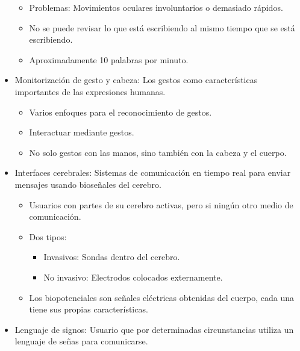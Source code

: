 \documentclass[12pt, twoside, openright]{report} %
\begin{document}
\begin{itemize}
	      \begin{itemize}
		      \item Problemas: Movimientos oculares involuntarios o demasiado rápidos.

		      \item No se puede revisar lo que está escribiendo al mismo tiempo que se
		            está escribiendo.

		      \item Aproximadamente 10 palabras por minuto.
	      \end{itemize}
	      \pagebreak
	\item Monitorización de gesto y cabeza: Los gestos como características
	      importantes de las expresiones humanas.

	      \begin{itemize}
		      \item Varios enfoques para el reconocimiento de gestos.

		      \item Interactuar mediante gestos.

		      \item No solo gestos con las manos, sino también con la cabeza y el
		            cuerpo.
	      \end{itemize}
	\item Interfaces cerebrales: Sistemas de comunicación en tiempo real para
	      enviar mensajes usando bioseñales del cerebro.

	      \begin{itemize}
		      \item Usuarios con partes de su cerebro activas, pero si ningún otro
		            medio de comunicación.

		      \item Dos tipos:

		            \begin{itemize}
			            \item Invasivos: Sondas dentro del cerebro.

			            \item No invasivo: Electrodos colocados externamente.
		            \end{itemize}

		      \item Los biopotenciales son señales eléctricas obtenidas del cuerpo,
		            cada una tiene sus propias características.
	      \end{itemize}
	\item Lenguaje de signos: Usuario que por determinadas circunstancias
	      utiliza un lenguaje de señas para comunicarse.


\end{itemize}
\end{document}
